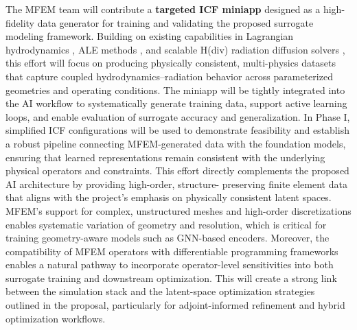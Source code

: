 The MFEM team will contribute a {\bf targeted ICF miniapp} designed as a
high-fidelity data generator for training and validating the proposed surrogate
modeling framework. Building on existing capabilities in Lagrangian
hydrodynamics \cite{Dobrev2012}, ALE methods \cite{Tomov2018}, and scalable
H(div) radiation diffusion solvers \cite{Pazner2025}, this effort will focus on
producing physically consistent, multi-physics datasets that capture coupled
hydrodynamics–radiation behavior across parameterized geometries and operating
conditions. The miniapp will be tightly integrated into the AI workflow to
systematically generate training data, support active learning loops, and
enable evaluation of surrogate accuracy and generalization. In Phase I,
simplified ICF configurations will be used to demonstrate feasibility and
establish a robust pipeline connecting MFEM-generated data with the foundation
models, ensuring that learned representations remain consistent with the
underlying physical operators and constraints.
This effort directly complements the proposed AI architecture by providing
high-order, structure- preserving finite element data that aligns with the
project’s emphasis on physically consistent latent spaces. MFEM’s support for
complex, unstructured meshes and high-order discretizations enables systematic
variation of geometry and resolution, which is critical for training
geometry-aware models such as GNN-based encoders. Moreover, the compatibility
of MFEM operators with differentiable programming frameworks enables a natural
pathway to incorporate operator-level sensitivities into both surrogate
training and downstream optimization. This will create a strong link between the
simulation stack and the latent-space optimization strategies outlined in the
proposal, particularly for adjoint-informed refinement and hybrid optimization
workflows.

